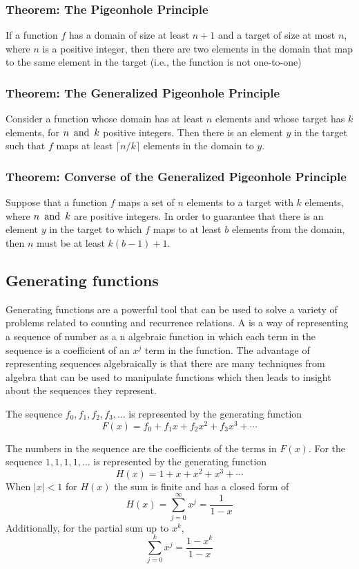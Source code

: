 \subsubsection*{Theorem: The Pigeonhole Principle}
If a function $f$ has a domain of size at least $n+1$ and a target of size at most $n$, where $n$ is a positive integer, then there are two elements in the domain that map to the same element in the target (i.e., the function is not one-to-one)

\subsubsection*{Theorem: The Generalized Pigeonhole Principle}
Consider a function whose domain has at least $n$ elements and whose target has $k$ elements, for $n \operatorname{~\text{and}~} k$ positive integers. Then there is an element $y$ in the target such that $f$ maps at least $\lceil n/k \rceil$ elements in the domain to $y$.

\subsubsection*{Theorem: Converse of the Generalized Pigeonhole Principle}
Suppose that a function $f$ maps a set of $n$ elements to a target with $k$ elements, where $n \operatorname{~\text{and}~} k$ are positive integers. In order to guarantee that there is an element $y$ in the target to which $f$ maps to at least $b$ elements from the domain, then $n$ must be at least $k(b-1)+1$.

\subsection{Generating functions}
Generating functions are a powerful tool that can be used to solve a variety of problems related to counting and recurrence relations. A  is a way of representing a sequence of number as a n algebraic function in which each term in the sequence is a coefficient of an $x^j$ term in the function. The advantage of representing sequences algebraically is that there are many techniques from algebra that can be used to manipulate functions which then leads to insight about the sequences they represent.

The sequence $f_0,f_1,f_2,f_3,\ldots$ is represented by the generating function
\[
  F(x) = f_0 + f_1x + f_2x^2 + f_3x^3 + \cdots
\]

The numbers in the sequence are the coefficients of the terms in $F(x)$. For the sequence $1,1,1,1,\ldots$ is represented by the generating function
\[
  H(x) = 1 + x + x^2 + x^3 + \cdots
\]
When $|x|<1$ for $H(x)$ the sum is finite and has a closed form of
\[
  H(x) = \sum_{j=0}^{\infty} x^j = \frac{1}{1-x}
\]
Additionally, for the partial sum up to $x^k$,
\[
  \sum_{j=0}^{k} x^j = \frac{1-x^k}{1-x}
\]

